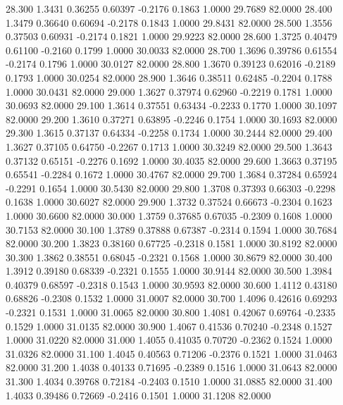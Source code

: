   28.300   1.3431   0.36255   0.60397  -0.2176   0.1863   1.0000  29.7689  82.0000
  28.400   1.3479   0.36640   0.60694  -0.2178   0.1843   1.0000  29.8431  82.0000
  28.500   1.3556   0.37503   0.60931  -0.2174   0.1821   1.0000  29.9223  82.0000
  28.600   1.3725   0.40479   0.61100  -0.2160   0.1799   1.0000  30.0033  82.0000
  28.700   1.3696   0.39786   0.61554  -0.2174   0.1796   1.0000  30.0127  82.0000
  28.800   1.3670   0.39123   0.62016  -0.2189   0.1793   1.0000  30.0254  82.0000
  28.900   1.3646   0.38511   0.62485  -0.2204   0.1788   1.0000  30.0431  82.0000
  29.000   1.3627   0.37974   0.62960  -0.2219   0.1781   1.0000  30.0693  82.0000
  29.100   1.3614   0.37551   0.63434  -0.2233   0.1770   1.0000  30.1097  82.0000
  29.200   1.3610   0.37271   0.63895  -0.2246   0.1754   1.0000  30.1693  82.0000
  29.300   1.3615   0.37137   0.64334  -0.2258   0.1734   1.0000  30.2444  82.0000
  29.400   1.3627   0.37105   0.64750  -0.2267   0.1713   1.0000  30.3249  82.0000
  29.500   1.3643   0.37132   0.65151  -0.2276   0.1692   1.0000  30.4035  82.0000
  29.600   1.3663   0.37195   0.65541  -0.2284   0.1672   1.0000  30.4767  82.0000
  29.700   1.3684   0.37284   0.65924  -0.2291   0.1654   1.0000  30.5430  82.0000
  29.800   1.3708   0.37393   0.66303  -0.2298   0.1638   1.0000  30.6027  82.0000
  29.900   1.3732   0.37524   0.66673  -0.2304   0.1623   1.0000  30.6600  82.0000
  30.000   1.3759   0.37685   0.67035  -0.2309   0.1608   1.0000  30.7153  82.0000
  30.100   1.3789   0.37888   0.67387  -0.2314   0.1594   1.0000  30.7684  82.0000
  30.200   1.3823   0.38160   0.67725  -0.2318   0.1581   1.0000  30.8192  82.0000
  30.300   1.3862   0.38551   0.68045  -0.2321   0.1568   1.0000  30.8679  82.0000
  30.400   1.3912   0.39180   0.68339  -0.2321   0.1555   1.0000  30.9144  82.0000
  30.500   1.3984   0.40379   0.68597  -0.2318   0.1543   1.0000  30.9593  82.0000
  30.600   1.4112   0.43180   0.68826  -0.2308   0.1532   1.0000  31.0007  82.0000
  30.700   1.4096   0.42616   0.69293  -0.2321   0.1531   1.0000  31.0065  82.0000
  30.800   1.4081   0.42067   0.69764  -0.2335   0.1529   1.0000  31.0135  82.0000
  30.900   1.4067   0.41536   0.70240  -0.2348   0.1527   1.0000  31.0220  82.0000
  31.000   1.4055   0.41035   0.70720  -0.2362   0.1524   1.0000  31.0326  82.0000
  31.100   1.4045   0.40563   0.71206  -0.2376   0.1521   1.0000  31.0463  82.0000
  31.200   1.4038   0.40133   0.71695  -0.2389   0.1516   1.0000  31.0643  82.0000
  31.300   1.4034   0.39768   0.72184  -0.2403   0.1510   1.0000  31.0885  82.0000
  31.400   1.4033   0.39486   0.72669  -0.2416   0.1501   1.0000  31.1208  82.0000
